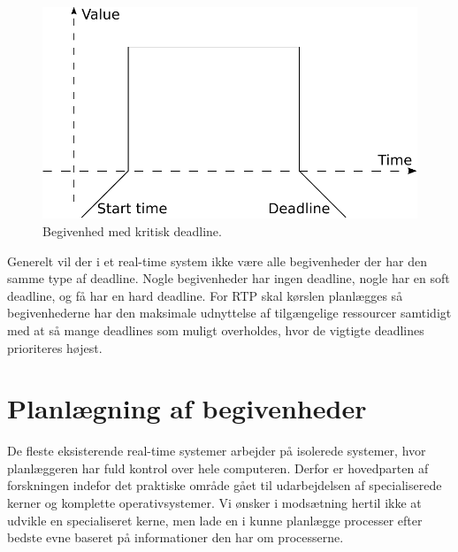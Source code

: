 \begin{figure}
 \begin{center}
  \includegraphics[scale=0.75]{images/critical-deadline}
	\caption{Begivenhed med kritisk deadline.}
	\label{fig:hard-rtp}
\end{center}
\end{figure}

Generelt vil der i et real-time system ikke være alle begivenheder der har den samme type af deadline. Nogle begivenheder har ingen deadline, nogle har en soft deadline, og få har en hard deadline. For RTP skal kørslen planlægges så begivenhederne har den maksimale udnyttelse af tilgængelige ressourcer samtidigt med at så mange deadlines som muligt overholdes, hvor de vigtigte deadlines prioriteres højest. 

\section{Planlægning af begivenheder}
De fleste eksisterende real-time systemer arbejder på isolerede systemer, hvor planlæggeren har fuld kontrol over hele computeren. Derfor er hovedparten af forskningen indefor det praktiske område gået til udarbejdelsen af specialiserede kerner og komplette operativsystemer\cite{damm1989real, jones1979staros, levi1989maruti,ramamritham14scheduling}. Vi ønsker i modsætning hertil ikke at udvikle en specialiseret kerne, men lade \sched en i \pycsp kunne planlægge processer efter bedste evne baseret på informationer den har om processerne.

